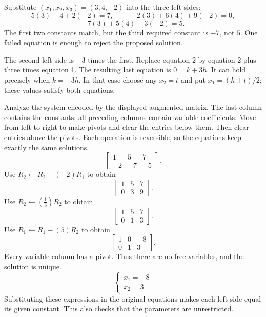 Substitute $(x_1,x_2,x_3)=(3,4,-2)$ into the three left sides:
\[
5(3)-4+2(-2)=7,\qquad -2(3)+6(4)+9(-2)=0,
\]
\[
-7(3)+5(4)-3(-2)=5.
\]
The first two constants match, but the third required constant is $-7$,
not $5$. One failed equation is enough to reject the proposed solution.

The second left side is $-3$ times the first. Replace equation 2 by
equation 2 plus three times equation 1. The resulting last equation is
$0=k+3h$. It can hold precisely when $k=-3h$. In that case choose any
$x_2=t$ and put $x_1=(h+t)/2$; these values satisfy both equations.

\goal Analyze the system encoded by the displayed augmented matrix. The last column contains the constants; all preceding columns contain variable coefficients.
\idea Move from left to right to make pivots and clear the entries below them. Then clear entries above the pivots. Each operation is reversible, so the equations keep exactly the same solutions.
\[ \left[\begin{array}{rr|r}1&5&7\\-2&-7&-5\end{array}\right].\]
Use $R_{2}\leftarrow R_{2}-(-2)R_{1}$ to obtain
\[ \left[\begin{array}{rr|r}1&5&7\\0&3&9\end{array}\right].\]
Use $R_{2}\leftarrow(\frac{1}{3})R_{2}$ to obtain
\[ \left[\begin{array}{rr|r}1&5&7\\0&1&3\end{array}\right].\]
Use $R_{1}\leftarrow R_{1}-(5)R_{2}$ to obtain
\[ \left[\begin{array}{rr|r}1&0&-8\\0&1&3\end{array}\right].\]
Every variable column has a pivot. Thus there are no free variables, and the solution is unique.
\[ \begin{cases}x_{1}=-8\\x_{2}=3\end{cases}\]
Substituting these expressions in the original equations makes each left side equal its given constant. This also checks that the parameters are unrestricted.

